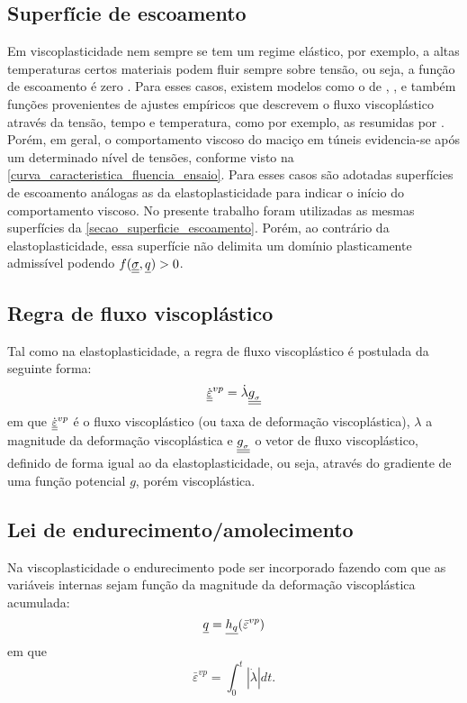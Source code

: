 \subsection{Superfície de escoamento}

Em viscoplasticidade nem sempre se tem um regime elástico, por exemplo, a altas temperaturas certos materiais podem fluir sempre sobre tensão, ou seja, a função de escoamento é zero \cite[p. 448]{Neto2008}. Para esses casos, existem modelos como o de , , e também funções provenientes de ajustes empíricos que descrevem o fluxo viscoplástico através da tensão, tempo e temperatura, como por exemplo, as resumidas por . Porém, em geral, o comportamento viscoso do maciço em túneis evidencia-se após um determinado nível de tensões, conforme visto na \autoref{curva_caracteristica_fluencia_ensaio}. Para esses casos são adotadas superfícies de escoamento análogas as da elastoplasticidade para indicar o início do comportamento viscoso. No presente trabalho foram utilizadas as mesmas superfícies da \autoref{secao_superficie_escoamento}. Porém, ao contrário da elastoplasticidade, essa superfície não delimita um domínio plasticamente admissível podendo $f(\underline{\underline \sigma},\underline q) > 0$.

\subsection{Regra de fluxo viscoplástico}
Tal como na elastoplasticidade, a regra de fluxo viscoplástico é postulada da seguinte forma:
\begin{equation}
	\label{eq:fluxo_viscoplastico}
	\dot {\underline{\underline \varepsilon}}^{vp} = \dot \lambda \underline{\underline {g_{_\sigma}}}
\end{equation}
em que $\dot {\underline{\underline \varepsilon}}^{vp}$ é o fluxo viscoplástico (ou taxa de deformação viscoplástica), $\lambda$ a magnitude da deformação viscoplástica e $\underline{\underline {g_{_\sigma}}}$ o vetor de fluxo viscoplástico, definido de forma igual ao da elastoplasticidade, ou seja, através do gradiente de uma função potencial $g$, porém viscoplástica.

\subsection{Lei de endurecimento/amolecimento}
Na viscoplasticidade o endurecimento pode ser incorporado fazendo com que as variáveis internas sejam função da magnitude da deformação viscoplástica acumulada:
\begin{equation}
	\label{eq:endurecimento_viscoplastico}
	\underline q=\underline{h_q}(\bar{\varepsilon}^{vp})
\end{equation}
em que
\begin{equation}
	\label{eq:epslonvpbar}
	\bar{\varepsilon}^{vp} = \int_{0}^{t}|\dot \lambda|dt.
\end{equation}

